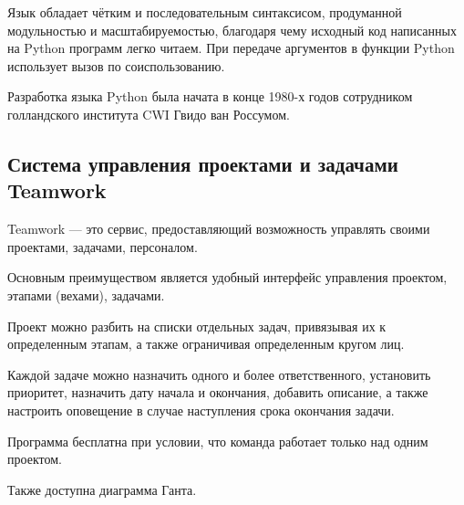 Язык обладает чётким и последовательным синтаксисом, продуманной модульностью и масштабируемостью, благодаря чему исходный код написанных на Python программ легко читаем. При передаче аргументов в функции Python использует вызов по соиспользованию.\par

Разработка языка Python была начата в конце 1980-х годов сотрудником голландского института CWI Гвидо ван Россумом.\\

\subsection{Система управления проектами и задачами Teamwork}

Teamwork --- это сервис, предоставляющий возможность управлять своими проектами, задачами, персоналом.\par

Основным преимуществом является удобный интерфейс управления проектом, этапами (вехами), задачами. \par
Проект можно разбить на списки отдельных задач, привязывая их к определенным этапам, а также ограничивая определенным кругом лиц. \par
Каждой задаче можно назначить одного и более ответственного, установить приоритет, назначить дату начала и окончания, добавить описание, а также настроить оповещение в случае наступления срока окончания задачи.\par

Программа бесплатна при условии, что команда работает только над одним проектом.\par

Также доступна диаграмма Ганта.\\

\clearpage